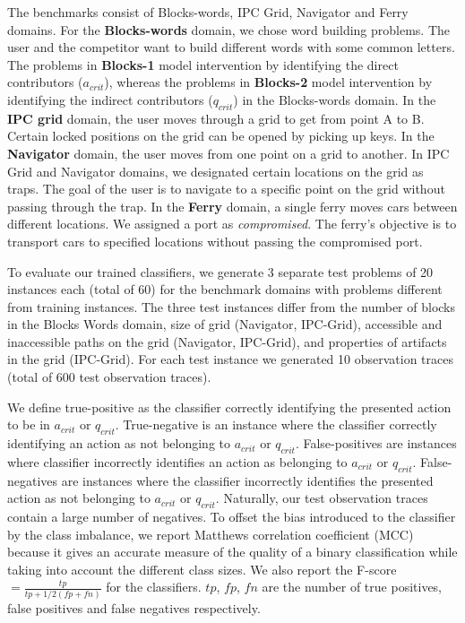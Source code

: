 The benchmarks consist of Blocks-words, IPC Grid, Navigator and Ferry domains. For the \textbf{Blocks-words} domain, we chose word building problems. The user and the competitor want to build different words with some common letters. 
The problems in \textbf{Blocks-1} model intervention by identifying the direct contributors ($a_{crit}$), whereas the problems in \textbf{Blocks-2} model intervention by identifying the indirect contributors ($q_{crit}$) in the Blocks-words domain.
In the \textbf{IPC grid} domain, the user moves through a grid to get from point A to B. 
Certain locked positions on the grid can be opened by picking up keys. In the \textbf{Navigator} domain, the user moves from one point on a grid to another. In IPC Grid and Navigator domains, we designated certain locations on the grid as traps. The goal of the user is to navigate to a specific point on the grid without passing through the trap. In the \textbf{Ferry} domain, a single ferry moves cars between different locations. We assigned a port as \emph{compromised}. The ferry's objective is to transport cars to specified locations without passing the compromised port. 


To evaluate our trained classifiers, we generate 3 separate test problems of 20 instances each (total of 60) 
for the benchmark domains with problems different from training instances. 
The three test instances differ from the number of blocks in the Blocks Words domain, size of grid (Navigator, IPC-Grid), accessible and inaccessible paths on the grid (Navigator, IPC-Grid), and properties of artifacts in the grid (IPC-Grid). 
For each test instance we generated 10 observation traces (total of 600 test observation traces). 


We define true-positive as the classifier correctly identifying the presented action to be in $a_{crit}$ or $q_{crit}$. 
True-negative is an instance where the classifier  correctly identifying an action as not belonging to $a_{crit}$ or $q_{crit}$. False-positives are instances where classifier incorrectly identifies an action as belonging to $a_{crit}$ or $q_{crit}$. False-negatives are instances where the classifier incorrectly identifies the presented action as not belonging to $a_{crit}$ or $q_{crit}$. 
Naturally, our test observation traces contain a large number of negatives. 
To offset the bias introduced to the classifier by the class imbalance, we report Matthews correlation coefficient (MCC) because it gives an accurate measure of the quality of a binary classification while taking into account the different class sizes.
 We also report the F-score $= \frac{tp}{tp+1/2(fp+fn)}$ for the classifiers. $tp$, $fp$, $fn$ are the number of true positives, false positives and false negatives respectively.

